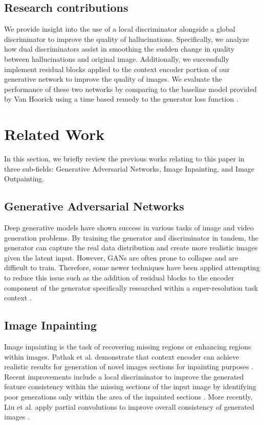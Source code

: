 \documentclass{article}
\begin{document}
\subsection{Research contributions}
We provide insight into the use of a local discriminator alongside a global discriminator to improve the quality of hallucinations. Specifically, we analyze how dual discriminators assist in smoothing the sudden change in quality between hallucinations and original image. Additionally, we successfully implement residual blocks applied to the context encoder portion of our generative network to improve the quality of images. We evaluate the performance of these two networks by comparing to the baseline model provided by Van Hoorick using a time based remedy to the generator loss function \citep{van_hoorick_image_2020}.

\section{Related Work}
In this section, we briefly review the previous works relating to this paper in three sub-fields: Generative Adversarial Networks, Image Inpainting, and Image Outpainting.

\subsection{Generative Adversarial Networks}
Deep generative models have shown success in various tasks of image and video generation problems. By training the generator and discriminator in tandem, the generator can capture the real data distribution and create more realistic images given the latent input. However, GANs are often prone to collapse and are difficult to train. Therefore, some newer techniques have been applied attempting to reduce this issue such as the addition of residual blocks to the encoder component of the generator specifically researched within a super-resolution task context \citep{lim_enhanced_2017}.

\subsection{Image Inpainting}
Image inpainting is the task of recovering missing regions or enhancing regions within images. Pathak et al. demonstrate that context encoder can achieve realistic results for generation of novel images sections for inpainting purposes \citep{pathak_context_2016}. Recent improvements include a local discriminator to improve the generated feature consistency within the missing sections of the input image by identifying poor generations only within the area of the inpainted sections \citep{iizuka_globally_2017}. More recently, Liu et al. apply partial convolutions to improve overall consistency of generated images \citep{liu_image_2018}.
\end{document}
